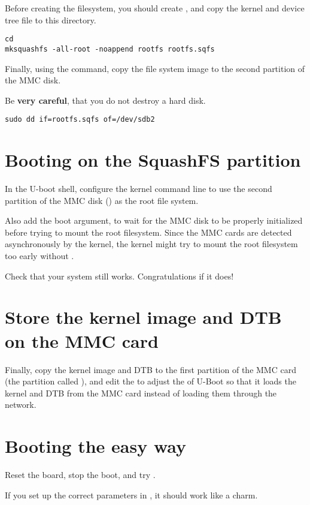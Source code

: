 Before creating the filesystem, you should create ,
and copy the kernel and device tree file to this directory.

\begin{verbatim}
cd
mksquashfs -all-root -noappend rootfs rootfs.sqfs
\end{verbatim}

Finally, using the  command, copy the file system image to
the second partition of the MMC disk.

Be {\bf very careful}, that you do not destroy a hard disk.

\begin{verbatim}
sudo dd if=rootfs.sqfs of=/dev/sdb2
\end{verbatim}

\section{Booting on the SquashFS partition}

In the U-boot shell, configure the kernel command line to use the
second partition of the MMC disk () as the 
root file system. 

Also add the  boot argument, to wait for the MMC disk to be properly
initialized before trying to mount the root filesystem. Since the MMC
cards are detected asynchronously by the kernel, the kernel might try
to mount the root filesystem too early without .

Check that your system still works. Congratulations if it does!

\section{Store the kernel image and DTB on the MMC card}

Finally, copy the  kernel image and DTB to the first partition of
the MMC card (the partition called ), and edit the 
to adjust the  of U-Boot so that it loads the kernel and DTB from the 
MMC card instead of loading them through the network.

\section{Booting the easy way}

Reset the board, stop the boot, and try .

If you set up the correct parameters in , it
should work like a charm.
 

